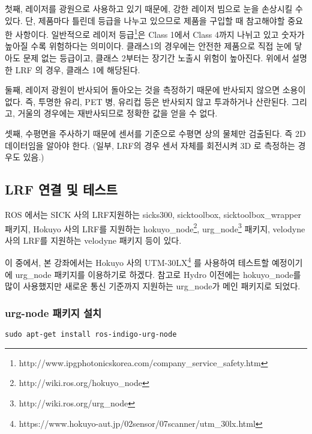 첫째, 레이저를 광원으로 사용하고 있기 때문에, 강한 레이저 빔으로 눈을 손상시킬 수 있다. 단, 제품마다 틀린데 등급을 나누고 있으므로 제품을 구입할 때 참고해야할 중요한 사항이다. 일반적으로 레이저 등급\footnote{http://www.ipgphotonicskorea.com/company\_service\_safety.htm}은 Class 1에서 Class 4까지 나뉘고 있고 숫자가 높아질 수록 위험하다는 의미이다. 클래스1의 경우에는 안전한 제품으로 직접 눈에 닿아도 문제 없는 등급이고, 클래스 2부터는 장기간 노출시 위험이 높아진다. 위에서 설명한 LRF 의 경우, 클래스 1에 해당된다.

둘째, 레이저 광원이 반사되어 돌아오는 것을 측정하기 때문에 반사되지 않으면 소용이 없다. 즉, 투명한 유리, PET 병, 유리컵 등은 반사되지 않고 투과하거나 산란된다. 그리고, 거울의 경우에는 재반사되므로 정확한 값을 얻을 수 없다.

셋째, 수평면을 주사하기 때문에 센서를 기준으로 수평면 상의  물체만 검출된다. 즉 2D 데이터임을 알아야 한다. (일부, LRF의 경우 센서 자체를 회전시켜 3D 로 측정하는 경우도 있음.)

\subsection{LRF 연결 및 테스트}

ROS 에서는 SICK 사의 LRF지원하는 sicks300, sicktoolbox, sicktoolbox\_wrapper 패키지, Hokuyo 사의 LRF를 지원하는 hokuyo\_node\footnote{http://wiki.ros.org/hokuyo\_node}, urg\_node\footnote{http://wiki.ros.org/urg\_node} 패키지, velodyne 사의 LRF를 지원하는 velodyne 패키지 등이 있다.

이 중에서, 본 강좌에서는 Hokuyo 사의 UTM-30LX\footnote{https://www.hokuyo-aut.jp/02sensor/07scanner/utm\_30lx.html} 를 사용하여 테스트할 예정이기에 urg\_node 패키지를 이용하기로 하겠다. 참고로 Hydro 이전에는 hokuyo\_node를 많이 사용했지만 새로운 통신 기준까지 지원하는 urg\_node가 메인 패키지로 되었다.

\subsubsection{urg-node 패키지 설치}

\begin{lstlisting}[language=ROS]
sudo apt-get install ros-indigo-urg-node 
\end{lstlisting}

